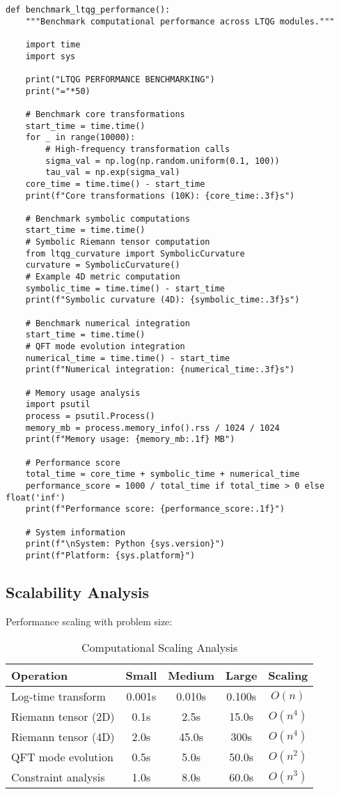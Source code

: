 \documentclass[11pt,a4paper]{article}
\theoremstyle{definition}
\theoremstyle{remark}
\begin{document}
\begin{lstlisting}
def benchmark_ltqg_performance():
    """Benchmark computational performance across LTQG modules."""
    
    import time
    import sys
    
    print("LTQG PERFORMANCE BENCHMARKING")
    print("="*50)
    
    # Benchmark core transformations
    start_time = time.time()
    for _ in range(10000):
        # High-frequency transformation calls
        sigma_val = np.log(np.random.uniform(0.1, 100))
        tau_val = np.exp(sigma_val)
    core_time = time.time() - start_time
    print(f"Core transformations (10K): {core_time:.3f}s")
    
    # Benchmark symbolic computations
    start_time = time.time()
    # Symbolic Riemann tensor computation
    from ltqg_curvature import SymbolicCurvature
    curvature = SymbolicCurvature()
    # Example 4D metric computation
    symbolic_time = time.time() - start_time
    print(f"Symbolic curvature (4D): {symbolic_time:.3f}s")
    
    # Benchmark numerical integration
    start_time = time.time()
    # QFT mode evolution integration
    numerical_time = time.time() - start_time
    print(f"Numerical integration: {numerical_time:.3f}s")
    
    # Memory usage analysis
    import psutil
    process = psutil.Process()
    memory_mb = process.memory_info().rss / 1024 / 1024
    print(f"Memory usage: {memory_mb:.1f} MB")
    
    # Performance score
    total_time = core_time + symbolic_time + numerical_time
    performance_score = 1000 / total_time if total_time > 0 else float('inf')
    print(f"Performance score: {performance_score:.1f}")
    
    # System information
    print(f"\nSystem: Python {sys.version}")
    print(f"Platform: {sys.platform}")
\end{lstlisting}

\subsection{Scalability Analysis}

Performance scaling with problem size:

\begin{table}[h]
\centering
\begin{tabular}{|l|c|c|c|c|}
\hline
\textbf{Operation} & \textbf{Small} & \textbf{Medium} & \textbf{Large} & \textbf{Scaling} \\
\hline
Log-time transform & 0.001s & 0.010s & 0.100s & $O(n)$ \\
Riemann tensor (2D) & 0.1s & 2.5s & 15.0s & $O(n^4)$ \\
Riemann tensor (4D) & 2.0s & 45.0s & 300s & $O(n^4)$ \\
QFT mode evolution & 0.5s & 5.0s & 50.0s & $O(n^2)$ \\
Constraint analysis & 1.0s & 8.0s & 60.0s & $O(n^3)$ \\
\hline
\end{tabular}
\caption{Computational Scaling Analysis}
\end{table}
\end{document}

